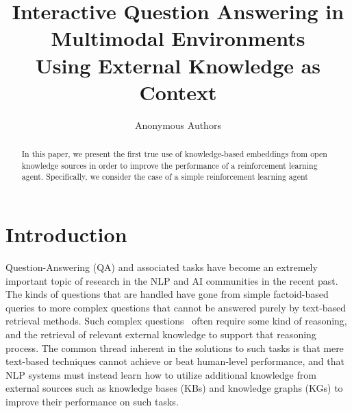 \documentclass[letterpaper]{article} \usepackage{aaai20}  \usepackage{times}  \usepackage{helvet} \usepackage{courier}  \usepackage[hyphens]{url}  \usepackage{graphicx} \urlstyle{rm} \def\UrlFont{\rm}  \usepackage{graphicx}  \frenchspacing  \setlength{\pdfpagewidth}{8.5in}  \setlength{\pdfpageheight}{11in}
\title{Interactive Question Answering in Multimodal Environments\\ Using External Knowledge as Context}
\author{Anonymous Authors
}
\begin{document}
\maketitle


\begin{abstract}

In this paper, we present the first true use of knowledge-based embeddings from open knowledge sources in order to improve the performance of a reinforcement learning agent. Specifically, we consider the case of a simple reinforcement learning agent 





\end{abstract}


\section{Introduction}
\label{sec:intro}

Question-Answering (QA) and associated tasks have become an extremely important topic of research in the NLP and AI communities in the recent past. The kinds of questions that are handled have gone from simple factoid-based queries to more complex questions that cannot be answered purely by text-based retrieval methods. Such complex questions~\cite{BoPaMiYu18} often require some kind of reasoning, and the retrieval of relevant external knowledge to support that reasoning process. The common thread inherent in the solutions to such tasks is that mere text-based techniques cannot achieve or beat human-level performance, and that NLP systems must instead learn how to utilize additional knowledge from external sources such as knowledge bases (KBs) and knowledge graphs (KGs) to improve their performance on such tasks.
\end{document}
